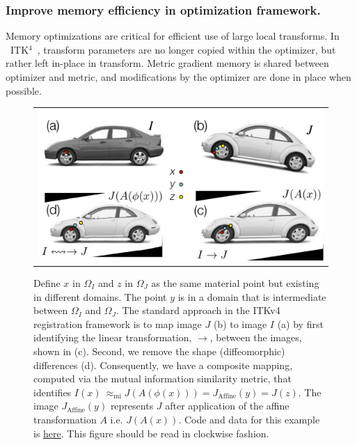 \documentclass{frontiersSCNS}
\newcommand{\tk}{~ITK$^{\text{4}}$~}
\begin{document}
\subsubsection{Improve memory efficiency in optimization framework.}
Memory optimizations are critical for efficient use of large local transforms.
In \tk, transform parameters are no longer copied within the optimizer, but rather left in-place in transform. 
Metric gradient memory is shared between optimizer and metric, and modifications by the optimizer  are done in place when possible.
\begin{figure}[t]
\begin{center}
\begin{tabular}{c}
\includegraphics[width=5in]{figs/RegistrationNomenclature.pdf}
\end{tabular}
\caption{Define $x$ in $\Omega_I$ and $z$ in
  $\Omega_J$ as the same material point but existing in different
  domains.  The point $y$ is in a domain that is intermediate between
  $\Omega_I$ and $\Omega_J$.  The standard approach in the ITKv4
  registration framework is to map image $J$ (b) to image $I$ (a) by first
  identifying the linear transformation, $\rightarrow$, between the images, shown in (c).  Second, we remove the shape (diffeomorphic)
  differences (d).  Consequently, we have a composite mapping, computed via the
  mutual information similarity metric, that identifies
  $I(x) ~\approx_\text{mi}  J(A(\phi(x))) =  J_\text{Affine}(y) = J(z)
  $. The image $J_\text{Affine}(y)$
  represents $J$ after application of the affine transformation $A$
  i.e. $J(A(x))$.  Code and data for this example is
  \href{http://stnava.github.io/cars/}{here}.  This figure should be
  read in clockwise fashion.}
\label{fig:composite}
\end{center}
\end{figure}
\end{document}
